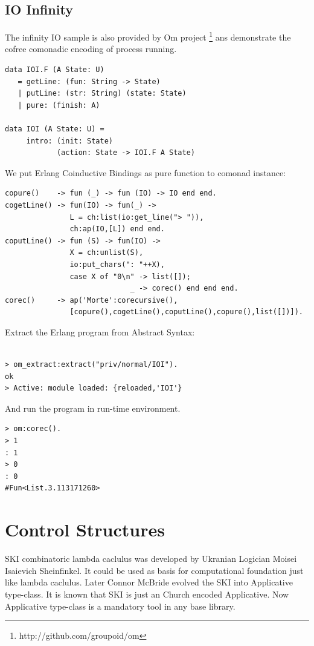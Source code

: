 \documentclass{article}
\begin{document}
\subsection{IO Infinity}

The infinity IO sample is also provided by Om project \footnote{http://github.com/groupoid/om}
ans demonstrate the cofree comonadic encoding of process running.

\begin{lstlisting}[mathescape=true]
data IOI.F (A State: U)
   = getLine: (fun: String -> State)
   | putLine: (str: String) (state: State)
   | pure: (finish: A)

data IOI (A State: U) =
     intro: (init: State)
            (action: State -> IOI.F A State)
\end{lstlisting}

We put Erlang Coinductive Bindings as pure function to comonad instance:

\begin{lstlisting}[mathescape=true]
copure()    -> fun (_) -> fun (IO) -> IO end end.
cogetLine() -> fun(IO) -> fun(_) ->
               L = ch:list(io:get_line("> ")),
               ch:ap(IO,[L]) end end.
coputLine() -> fun (S) -> fun(IO) ->
               X = ch:unlist(S),
               io:put_chars(": "++X),
               case X of "0\n" -> list([]);
                             _ -> corec() end end end.
corec()     -> ap('Morte':corecursive(),
               [copure(),cogetLine(),coputLine(),copure(),list([])]).
\end{lstlisting}

Extract the Erlang program from Abstract Syntax:

\begin{lstlisting}[mathescape=true]

> om_extract:extract("priv/normal/IOI").
ok
> Active: module loaded: {reloaded,'IOI'}
\end{lstlisting}

And run the program in run-time environment.

\begin{lstlisting}[mathescape=true]
> om:corec().
> 1
: 1
> 0
: 0
#Fun<List.3.113171260>
\end{lstlisting}

\newpage
\section{Control Structures}

SKI combinatoric lambda caclulus was developed by Ukranian Logician
Moisei Isaievich Sheinfinkel. It could be used as basis for computational
foundation just like lambda caclulus. Later Connor McBride evolved the SKI
into Applicative type-class. It is known that SKI is just an Church encoded Applicative.
Now Applicative type-class is a mandatory tool in any base library.
\end{document}
